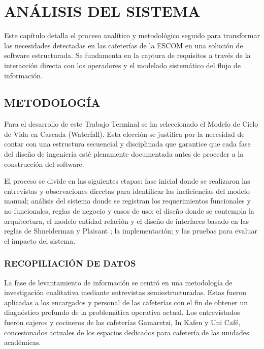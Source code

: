 
\chapter{ANÁLISIS DEL SISTEMA}
Este capítulo detalla el proceso analítico y metodológico seguido para transformar las necesidades detectadas en las cafeterías de la ESCOM en una solución de software estructurada. Se fundamenta en la captura de requisitos a través de la interacción directa con los operadores y el modelado sistemático del flujo de información. 

\section{METODOLOGÍA}
Para el desarrollo de este Trabajo Terminal se ha seleccionado el Modelo de Ciclo de Vida en Cascada (Waterfall). Esta elección se justifica por la necesidad de contar con una estructura secuencial y disciplinada que garantice que cada fase del diseño de ingeniería esté plenamente documentada antes de proceder a la construcción del software. 

El proceso se divide en las siguientes etapas: fase inicial donde se realizaron las entrevistas y observaciones directas para identificar las ineficiencias del modelo manual; análisis del sistema donde se registran los requerimientos funcionales y no funcionales, reglas de negocio y casos de uso; el diseño donde se contempla la arquitectura, el modelo entidad relación y el diseño de interfaces basado en las reglas de Shneiderman y Plaisant \cite{shneiderman2005designing}; la implementación; y las pruebas para evaluar el impacto del sistema. 

\subsection{RECOPILIACIÓN DE DATOS}
La fase de levantamiento de información se centró en una metodología de investigación cualitativa mediante entrevistas semiestructuradas. Estas fueron aplicadas a los encargados y personal de las cafeterías con el fin de obtener un diagnóstico profundo de la problemática operativa actual. Los entrevistados fueron cajeros y cocineros de las cafeterías Gamaretzi, In Kafen y Uni Café, concesionados actuales de los espacios dedicados para cafetería de las unidades académicas. 

\begingroup
\setlength{\LTleft}{\fill}
\setlength{\LTright}{\fill}

